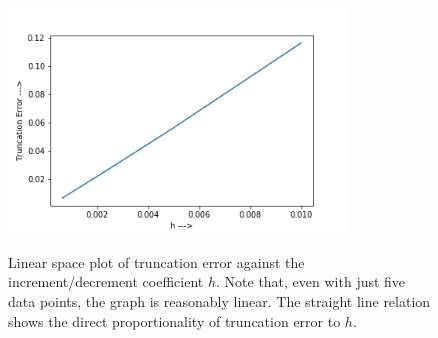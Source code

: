 \documentclass{report}
\begin{document}
\begin{figure}[H]
	\centering
	\includegraphics[width = 0.8\textwidth]{trE.png}
	\label{logloge}
	\caption{Linear space plot of truncation error against the increment/decrement coefficient $h$. Note that, even with just five data points, the graph is reasonably linear. The straight line relation shows the direct proportionality of truncation error to $h$.}
\end{figure}
\end{document}
